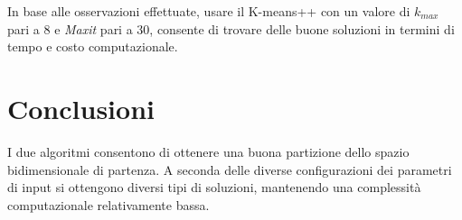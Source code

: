 \documentclass[12pt,a4paper,oneside,hidelinks]{report}
\begin{document}
In base alle osservazioni effettuate, usare il K-means++ con un valore di $k_{max}$ pari a 8 e \textit{Maxit} pari a 30, consente di trovare delle buone soluzioni in termini di tempo e costo computazionale.

\section*{Conclusioni}    
I due algoritmi consentono di ottenere una buona partizione dello spazio bidimensionale di partenza. A seconda delle diverse configurazioni dei parametri di input si ottengono diversi tipi di soluzioni, mantenendo una complessità computazionale relativamente bassa.

\end{document}
